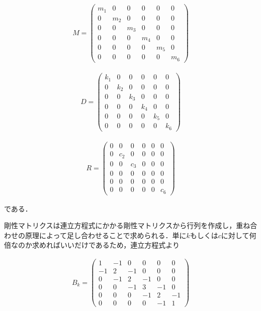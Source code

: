 \begin{eqnarray}
    M = 
    \left(\begin{matrix}
        m_1 & 0   & 0   & 0   & 0   & 0   \\
        0   & m_2 & 0   & 0   & 0   & 0   \\
        0   & 0   & m_3 & 0   & 0   & 0   \\
        0   & 0   & 0   & m_4 & 0   & 0   \\
        0   & 0   & 0   & 0   & m_5 & 0   \\
        0   & 0   & 0   & 0   & 0   & m_6 
    \end{matrix}\right)
\end{eqnarray}

\begin{eqnarray}
    D =
    \left(\begin{matrix}
        k_1 & 0   & 0   & 0   & 0   & 0    \\
        0   & k_2 & 0   & 0   & 0   & 0    \\
        0   & 0   & k_3 & 0   & 0   & 0    \\
        0   & 0   & 0   & k_4 & 0   & 0    \\
        0   & 0   & 0   & 0   & k_5 & 0    \\
        0   & 0   & 0   & 0   & 0   & k_6  
    \end{matrix}\right)
\end{eqnarray}

\begin{eqnarray}
    R = 
    \left(\begin{matrix}
        0   & 0   & 0   & 0   & 0   & 0   \\
        0   & c_2 & 0   & 0   & 0   & 0   \\
        0   & 0   & c_3 & 0   & 0   & 0   \\
        0   & 0   & 0   & 0   & 0   & 0   \\
        0   & 0   & 0   & 0   & 0   & 0   \\
        0   & 0   & 0   & 0   & 0   & c_6 
    \end{matrix}\right)
\end{eqnarray}

である．

剛性マトリクスは連立方程式にかかる剛性マトリクスから行列を作成し，重ね合わせの原理によって足し合わせることで求められる．単に$k$もしくは$c$に対して何倍なのか求めればいいだけであるため，連立方程式より

\begin{eqnarray}
    B_k = 
    \left(\begin{matrix}
        1   & -1  & 0   & 0   & 0  & 0  \\
        -1  & 2   & -1  & 0   & 0  & 0  \\
        0   & -1  & 2   & -1  & 0  & 0  \\
        0   & 0   & -1  & 3   & -1 & 0  \\
        0   & 0   & 0   & -1  & 2  & -1 \\
        0   & 0   & 0   & 0   & -1 & 1  
    \end{matrix}\right)
\end{eqnarray}

